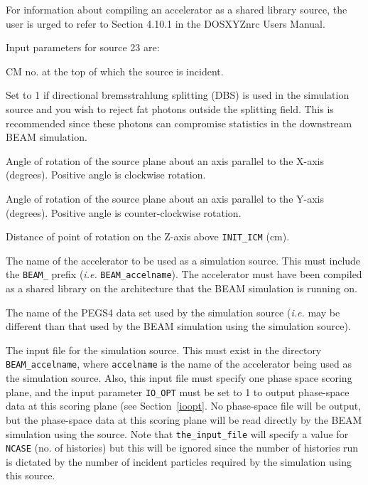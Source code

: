 \documentclass[12pt,twoside]{article}
\begin{document}
 For information about compiling an accelerator as a shared
library source, the user is urged to refer to Section 4.10.1 in the DOSXYZnrc Users Manual\cite{Wa05}.

Input parameters for source 23 are:
\begin{description}
\item [INIT\_ICM] CM no. at the top of which the source is incident.
\item [ISRC\_DBS] Set to 1 if directional bremsstrahlung splitting (DBS) is used
in the simulation source and you wish to reject fat photons outside the splitting
field.  This is recommended since these photons can compromise statistics in the
downstream BEAM simulation.
\item [ALPHA24] Angle of rotation of the source plane about an axis parallel to the X-axis (degrees).
Positive angle is clockwise rotation.
\item [BETA24] Angle of rotation of the source plane about an axis parallel to the Y-axis
(degrees).  Positive angle is counter-clockwise rotation.
\item [DIST24] Distance of point of rotation on the Z-axis above {\tt INIT\_ICM} (cm).
\item [the\_beam\_code] The name of the accelerator to be used as a simulation source.
This must include the {\tt BEAM\_} prefix ({\em i.e.} {\tt BEAM\_accelname}).  The accelerator
must have been compiled as a shared library on the architecture that the BEAM simulation
is running on.
\item [the\_pegs\_file] The name of the PEGS4 data set used by
the simulation source ({\em i.e.} may be different than that used by the BEAM simulation
using the simulation source).
\item [the\_input\_file] The input file for the simulation source.  This must exist in
the directory {\tt BEAM\_accelname}, where {\tt accelname} is the name of the
accelerator being used as the simulation source.  Also, this input file must specify
one phase space scoring plane, and the input parameter {\tt IO\_OPT} must be set
to 1 to output phase-space data at this scoring plane (see Section~\ref{ioopt}.  No phase-space file will be output,
but the phase-space data at this scoring plane will be read directly by the BEAM simulation
using the source.
Note that {\tt the\_input\_file} will specify a value for
{\tt NCASE} (no. of histories) but this will be ignored since the number of histories run
is dictated by the number of incident particles required by the simulation using this
source.
\end{description}
\end{document}
